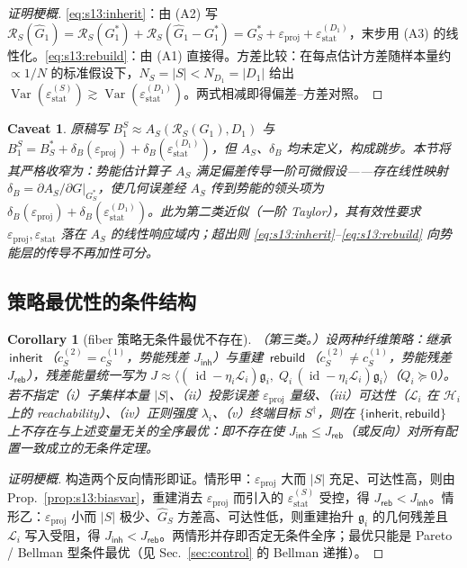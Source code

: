 \documentclass[11pt,a4paper]{article}
\newtheorem{corollary}[theorem]{Corollary}
\newtheorem{caveat}[theorem]{Caveat}
\DeclareMathOperator{\Var}{Var}
\DeclareMathOperator{\id}{id}
\newcommand{\cH}{\mathcal{H}}   %
\newcommand{\cL}{\mathcal{L}}   %
\newcommand{\Rstr}{\mathcal{R}}     %
\newcommand{\gres}{\bm{\mathfrak{g}}} %
\begin{document}
\begin{proof}[证明梗概]
\eqref{eq:s13:inherit}：由 (A2) 写 $\Rstr_S(\widehat{G}_1)=\Rstr_S(G_1^*)+\Rstr_S(\widehat{G}_1-G_1^*)=G_S^*+\varepsilon_{\mathrm{proj}}+\varepsilon_{\mathrm{stat}}^{(D_1)}$，末步用 (A3) 的线性化。\eqref{eq:s13:rebuild}：由 (A1) 直接得。方差比较：在每点估计方差随样本量约 $\propto 1/N$ 的标准假设下，$N_S=|S|<N_{D_1}=|D_1|$ 给出 $\Var(\varepsilon_{\mathrm{stat}}^{(S)})\gtrsim\Var(\varepsilon_{\mathrm{stat}}^{(D_1)})$。两式相减即得偏差--方差对照。
\end{proof}

\begin{caveat}\label{cav:s13:AS}
原稿写 $B_1^S\approx A_S(\Rstr_S(G_1),D_1)$ 与 $B_1^S=B_S^*+\delta_B(\varepsilon_{\mathrm{proj}})+\delta_B(\varepsilon_{\mathrm{stat}}^{(D_1)})$，但 $A_S$、$\delta_B$ 均未定义，构成跳步。本节将其严格收窄为：势能估计算子 $A_S$ 满足\emph{偏差传导一阶可微}假设——存在线性映射 $\delta_B=\partial A_S/\partial G\big|_{G_S^*}$，使几何误差经 $A_S$ 传到势能的领头项为 $\delta_B(\varepsilon_{\mathrm{proj}})+\delta_B(\varepsilon_{\mathrm{stat}}^{(D_1)})$。此为第二类近似（一阶 Taylor），其有效性要求 $\varepsilon_{\mathrm{proj}},\varepsilon_{\mathrm{stat}}$ 落在 $A_S$ 的线性响应域内；超出则 \eqref{eq:s13:inherit}--\eqref{eq:s13:rebuild} 向势能层的传导不再加性可分。
\end{caveat}

\subsection{策略最优性的条件结构}

\begin{corollary}[fiber 策略无条件最优不存在]\label{cor:s13:noopt}
（第三类。）设两种纤维策略：继承 $\,\textsf{inherit}\,$（$c_S^{(2)}=c_S^{(1)}$，势能残差 $J_{\textsf{inh}}$）与重建 $\,\textsf{rebuild}\,$（$c_S^{(2)}\neq c_S^{(1)}$，势能残差 $J_{\textsf{reb}}$），残差能量统一写为 $J\approx\big\langle (\,\id-\eta_i\cL_i)\gres_i,\;Q_i\,(\id-\eta_i\cL_i)\gres_i\big\rangle$（$Q_i\succeq0$）。若不指定（i）子集样本量 $|S|$、（ii）投影误差 $\varepsilon_{\mathrm{proj}}$ 量级、（iii）可达性（$\cL_i$ 在 $\cH_i$ 上的 reachability）、（iv）正则强度 $\lambda_i$、（v）终端目标 $S^\dagger$，则在 $\{\textsf{inherit},\textsf{rebuild}\}$ 上\emph{不存在}与上述变量无关的全序最优：即不存在使 $J_{\textsf{inh}}\le J_{\textsf{reb}}$（或反向）对所有配置一致成立的无条件定理。
\end{corollary}

\begin{proof}[证明梗概]
构造两个反向情形即证。情形甲：$\varepsilon_{\mathrm{proj}}$ 大而 $|S|$ 充足、可达性高，则由 Prop.~\ref{prop:s13:biasvar}，重建消去 $\varepsilon_{\mathrm{proj}}$ 而引入的 $\varepsilon_{\mathrm{stat}}^{(S)}$ 受控，得 $J_{\textsf{reb}}<J_{\textsf{inh}}$。情形乙：$\varepsilon_{\mathrm{proj}}$ 小而 $|S|$ 极少、$\widehat{G}_S$ 方差高、可达性低，则重建抬升 $\gres_i$ 的几何残差且 $\cL_i$ 写入受阻，得 $J_{\textsf{inh}}<J_{\textsf{reb}}$。两情形并存即否定无条件全序；最优只能是 Pareto / Bellman 型条件最优（见 Sec.~\ref{sec:control} 的 Bellman 递推）。
\end{proof}
\end{document}
